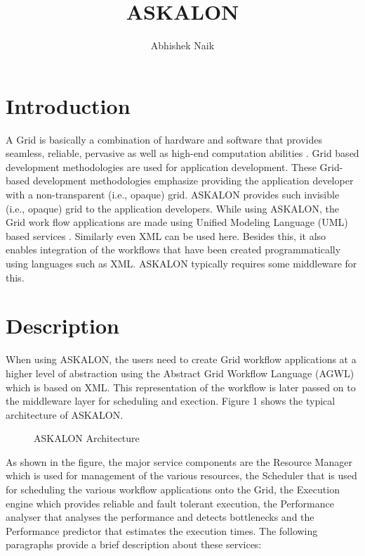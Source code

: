 \documentclass[9pt,twocolumn,twoside]{../../styles/osajnl}
\title{ASKALON}
\author[1,*]{Abhishek Naik}
\affil[1]{School of Informatics and Computing, Bloomington, IN 47408, U.S.A.}
\affil[*]{Corresponding authors: ahnaik@indiana.edu}
\begin{document}
\maketitle

\section{Introduction}

A Grid is basically a combination of hardware and software that
provides seamless, reliable, pervasive as well as high-end computation
abilities \cite{Workflow-book}.  Grid based development methodologies
are used for application development.  These Grid-based development
methodologies emphasize providing the application developer with a
non-transparent (i.e., opaque) grid.  ASKALON provides such invisible
(i.e., opaque) grid to the application developers.  While
using ASKALON, the Grid work flow applications are made using Unified
Modeling Language (UML) based services \cite{Workflow-book}.
Similarly even XML can be used here.  Besides this, it also enables
integration of the workflows that have been created programmatically
using languages such as XML.  ASKALON typically requires some
middleware for this.

\section{Description}

When using ASKALON, the users need to create Grid workflow
applications at a higher level of abstraction using the Abstract Grid
Workflow Language (AGWL) which is based on XML.  This representation
of the workflow is later passed on to the middleware layer for
scheduling and exection.  Figure 1 shows the typical architecture of
ASKALON.

\begin{figure}[htbp]
  \centering
  \caption{ASKALON Architecture \cite{Workflow-book}}
\end{figure}

As shown in the figure, the major service components are the
Resource Manager which is used for management of the various
resources, the Scheduler that is used for scheduling the various
workflow applications onto the Grid, the Execution engine which
provides reliable and fault tolerant execution, the Performance
  analyser that analyses the performance and detects bottlenecks and
the Performance predictor that estimates the execution times.
The following paragraphs provide a brief description about these
services:
\end{document}
